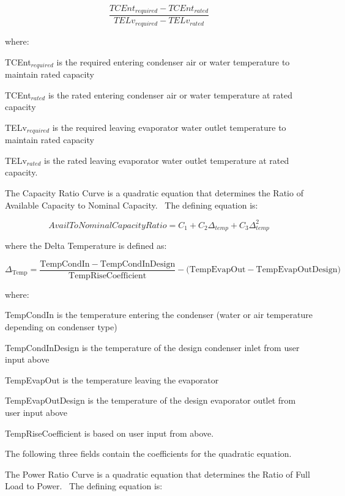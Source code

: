 \begin{equation}
\frac{{TCEn{t_{required}} - TCEn{t_{rated}}}}{{TEL{v_{required}} - TEL{v_{rated}}}}
\end{equation}

where:

TCEnt\(_{required}\) is the required entering condenser air or water temperature to maintain rated capacity

TCEnt\(_{rated}\) is the rated entering condenser air or water temperature at rated capacity

TELv\(_{required}\) is the required leaving evaporator water outlet temperature to maintain rated capacity

TELv\(_{rated}\) is the rated leaving evaporator water outlet temperature at rated capacity.

The Capacity Ratio Curve is a quadratic equation that determines the Ratio of Available Capacity to Nominal Capacity.~ The defining equation is:

\begin{equation}
AvailToNominalCapacityRatio = {C_1} + {C_2}{\Delta_{temp}} + {C_3}\Delta_{temp}^2
\end{equation}

where the Delta Temperature is defined as:

\begin{equation}
{\Delta_{{\mathrm{Temp}}}} = \frac{{{\mathrm{TempCondIn  -  TempCondInDesign }}}}{{{\mathrm{TempRiseCoefficient}}}} - ({\mathrm{TempEvapOut  -  TempEvapOutDesign)}}
\end{equation}

where:

TempCondIn is the temperature entering the condenser (water or air temperature depending on condenser type)

TempCondInDesign is the temperature of the design condenser inlet from user input above

TempEvapOut is the temperature leaving the evaporator

TempEvapOutDesign is the temperature of the design evaporator outlet from user input above

TempRiseCoefficient is based on user input from above.

The following three fields contain the coefficients for the quadratic equation.

The Power Ratio Curve is a quadratic equation that determines the Ratio of Full Load to Power.~ The defining equation is:

